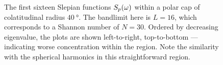 \begin{figure}[htpb]
	\newline
	\hfill
	\hfill
	\hfill
	\caption[
		The Slepian functions within a \(\SI{40}{\degree}\) polar cap
	]{
		The first sixteen Slepian functions \({S}_{p}(\omega)\) within a polar cap of colatitudinal radius \(\SI{40}{\degree}\).
		The bandlimit here is  \(L=16\), which corresponds to a Shannon number of \(N=30\).
		Ordered by decreasing eigenvalue, the plots are shown left-to-right, top-to-bottom --- indicating worse concentration within the region.
		Note the similarity with the spherical harmonics in this straightforward region.
	}\label{fig:chapter2_slepian_polar_cap}
\end{figure}
